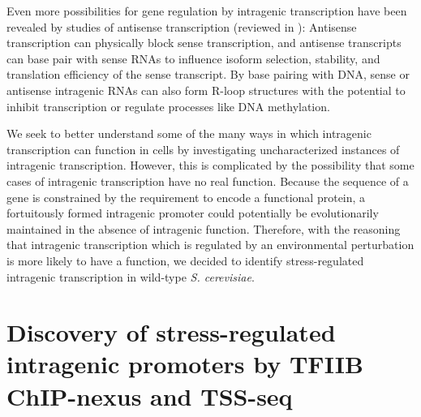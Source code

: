 Even more possibilities for gene regulation by intragenic transcription have been revealed by studies of antisense transcription (reviewed in \citet{pelechano2013b}): Antisense transcription can physically block sense transcription, and antisense transcripts can base pair with sense RNAs to influence isoform selection, stability, and translation efficiency of the sense transcript.
By base pairing with DNA, sense or antisense intragenic RNAs can also form R-loop structures with the potential to inhibit transcription or regulate processes like DNA methylation.

We seek to better understand some of the many ways in which intragenic transcription can function in cells by investigating uncharacterized instances of intragenic transcription.
However, this is complicated by the possibility that some cases of intragenic transcription have no real function.
Because the sequence of a gene is constrained by the requirement to encode a functional protein, a fortuitously formed intragenic promoter could potentially be evolutionarily maintained in the absence of intragenic function.
Therefore, with the reasoning that intragenic transcription which is regulated by an environmental perturbation is more likely to have a function, we decided to identify stress-regulated intragenic transcription in wild-type \textit{S. cerevisiae}.


\section[Discovery of stress-regulated intragenic promoters\\ by TFIIB ChIP-nexus and TSS-seq]{Discovery of stress-regulated intragenic promoters by TFIIB ChIP-nexus and TSS-seq}

